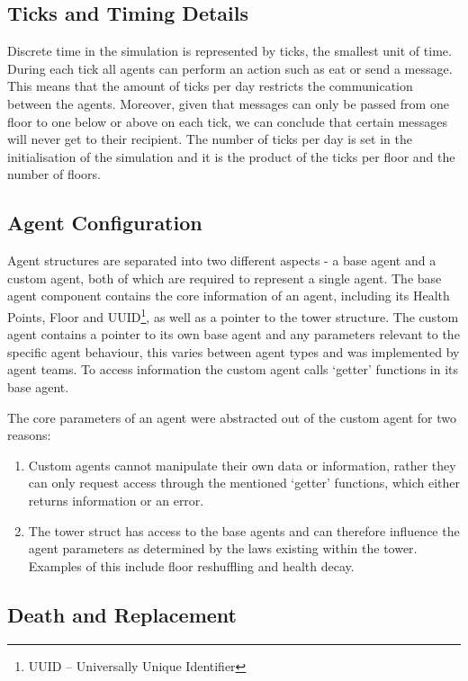 \subsection{Ticks and Timing Details}

Discrete time in the simulation is represented by ticks, the smallest unit of time. During each tick all agents can perform an action such as eat or send a message. This means that the amount of ticks per day restricts the communication between the agents. Moreover, given that messages can only be passed from one floor to one below or above on each tick, we can conclude that certain messages will never get to their recipient. The number of ticks per day is set in the initialisation of the simulation and it is the product of the ticks per floor and the number of floors.

\subsection{Agent Configuration}

Agent structures are separated into two different aspects - a base agent and a custom agent, both of which are required to represent a single agent.
The base agent component contains the core information of an agent, including its Health Points, Floor and UUID\footnote{UUID -- Universally Unique Identifier}, as well as a pointer to the tower structure. 
The custom agent contains a pointer to its own base agent and any parameters relevant to the specific agent behaviour, this varies between agent types and was implemented by agent teams. To access information the custom agent calls `getter' functions in its base agent.

The core parameters of an agent were abstracted out of the custom agent for two reasons:
\begin{enumerate}
    \item Custom agents cannot manipulate their own data or information, rather they can only request access through the mentioned `getter' functions, which either returns information or an error.
    \item The tower struct has access to the base agents and can therefore influence the agent parameters as determined by the laws existing within the tower. Examples of this include floor reshuffling and health decay.
\end{enumerate}

\subsection{Death and Replacement}

